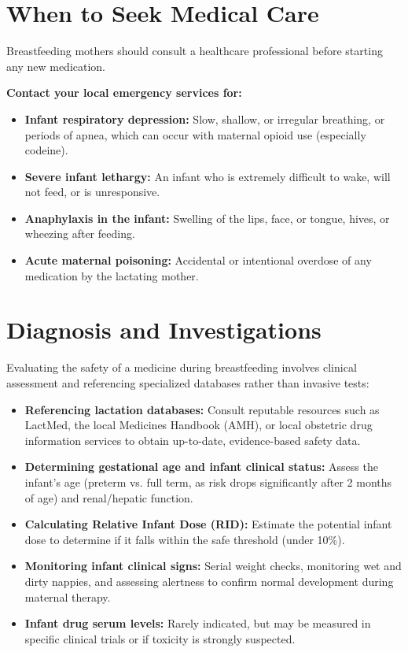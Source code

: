 \section*{When to Seek Medical Care}
Breastfeeding mothers should consult a healthcare professional before starting any new medication.

\textbf{Contact your local emergency services for:}
\begin{itemize}
    \item \textbf{Infant respiratory depression:} Slow, shallow, or irregular breathing, or periods of apnea, which can occur with maternal opioid use (especially codeine).
    \item \textbf{Severe infant lethargy:} An infant who is extremely difficult to wake, will not feed, or is unresponsive.
    \item \textbf{Anaphylaxis in the infant:} Swelling of the lips, face, or tongue, hives, or wheezing after feeding.
    \item \textbf{Acute maternal poisoning:} Accidental or intentional overdose of any medication by the lactating mother.
\end{itemize}

\section*{Diagnosis and Investigations}
Evaluating the safety of a medicine during breastfeeding involves clinical assessment and referencing specialized databases rather than invasive tests:
\begin{itemize}
    \item \textbf{Referencing lactation databases:} Consult reputable resources such as LactMed, the local Medicines Handbook (AMH), or local obstetric drug information services to obtain up-to-date, evidence-based safety data.
    \item \textbf{Determining gestational age and infant clinical status:} Assess the infant's age (preterm vs. full term, as risk drops significantly after 2 months of age) and renal/hepatic function.
    \item \textbf{Calculating Relative Infant Dose (RID):} Estimate the potential infant dose to determine if it falls within the safe threshold (under 10\%).
    \item \textbf{Monitoring infant clinical signs:} Serial weight checks, monitoring wet and dirty nappies, and assessing alertness to confirm normal development during maternal therapy.
    \item \textbf{Infant drug serum levels:} Rarely indicated, but may be measured in specific clinical trials or if toxicity is strongly suspected.
\end{itemize}


